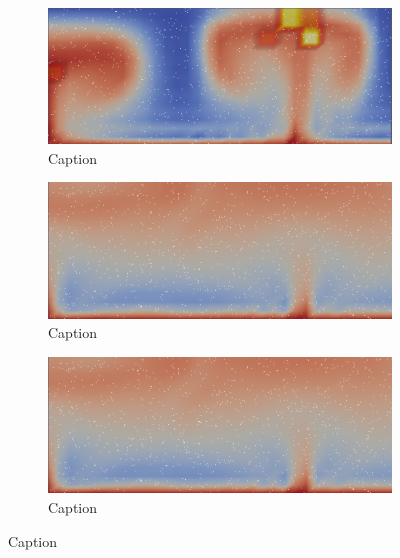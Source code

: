 \begin{figure}
\begin{subfigure}{0.49\textwidth}
        \centering
        \includegraphics[width=\textwidth]{figures/box_batch38.png}
        \caption{Caption}
        \label{fig:my_label}
    \end{subfigure}
    \begin{subfigure}{0.49\textwidth}
        \centering
        \includegraphics[width=\textwidth]{figures/box_batch79.png}
        \caption{Caption}
        \label{fig:my_label}
    \end{subfigure}
    \hfill
    \begin{subfigure}{0.49\textwidth}
        \centering
        \includegraphics[width=\textwidth]{figures/box_batch79.png}
        \caption{Caption}
        \label{fig:my_label}
    \end{subfigure}
\end{figure}
